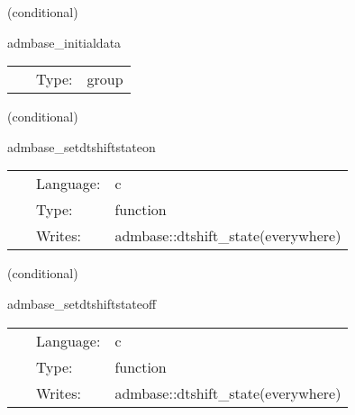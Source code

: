 \documentclass{article}
\begin{document}
\vspace{5mm}

   (conditional) 

\hspace{5mm} admbase\_initialdata 

\hspace{5mm}{\it schedule group for calculating adm initial data } 


\hspace{5mm}

 \begin{tabular*}{160mm}{cll} 
~ & Type:  & group \\ 
\end{tabular*} 


\vspace{5mm}

   (conditional) 

\hspace{5mm} admbase\_setdtshiftstateon 

\hspace{5mm}{\it set the dtshift\_state variable to 1 } 


\hspace{5mm}

 \begin{tabular*}{160mm}{cll} 
~ & Language:  & c \\ 
~ & Type:  & function \\ 
~ & Writes:  & admbase::dtshift\_state(everywhere) \\ 
\end{tabular*} 


\vspace{5mm}

   (conditional) 

\hspace{5mm} admbase\_setdtshiftstateoff 

\hspace{5mm}{\it set the dtshift\_state variable to 0 } 


\hspace{5mm}

 \begin{tabular*}{160mm}{cll} 
~ & Language:  & c \\ 
~ & Type:  & function \\ 
~ & Writes:  & admbase::dtshift\_state(everywhere) \\ 
\end{tabular*} 
\end{document}
